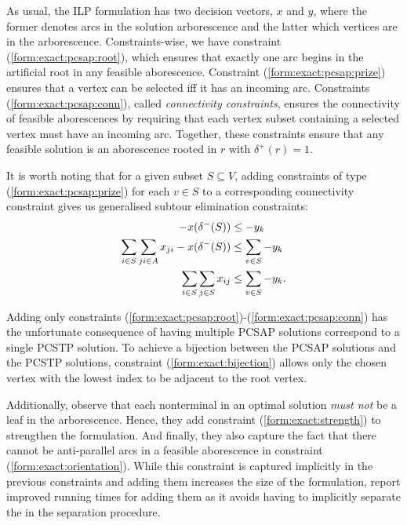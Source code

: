  As usual, the ILP formulation has two decision vectors, $x$ and $y$, where the former denotes arcs
 in the solution arborescence and the latter which vertices are in the arborescence. Constraints-wise,
 we have
 constraint (\ref{form:exact:pcsap:root}), which ensures that exactly one arc begins in the artificial
 root in any feasible aborescence. Constraint (\ref{form:exact:pcsap:prize}) ensures
 that a vertex can be selected iff it has an incoming arc.
 Constraints (\ref{form:exact:pcsap:conn}), called \textit{connectivity constraints},
 ensures the connectivity of feasible aborescences by requiring that
 each vertex subset containing a selected vertex must have an incoming arc.
 Together, these constraints ensure that any feasible solution is an aborescence rooted
 in $r$ with $\delta^+(r) = 1$.

 It is worth noting that for a given subset $S \subseteq V$, adding constraints of type
 (\ref{form:exact:pcsap:prize}) for each $v \in S$ to a corresponding connectivity constraint
  gives us generalised subtour elimination constraints:
 \begin{align*}
   -x(\delta^-(S)) &\leq -y_k \\
   \sum_{i \in S} \sum_{ji \in A} x_{ji} - x (\delta^-(S)) &\leq \sum_{v \in S} - y_k \\
   \sum_{i \in S} \sum_{j \in S} x_{ij} &\leq \sum_{v \in S} - y_k \mathnormal{.}
 \end{align*}

 Adding only constraints (\ref{form:exact:pcsap:root})-(\ref{form:exact:pcsap:conn})
 has the unfortunate consequence of having multiple 
 PCSAP solutions
 correspond
 to a single PCSTP solution. To achieve a bijection between the PCSAP solutions and the
 PCSTP solutions, constraint (\ref{form:exact:bijection}) allows only the chosen vertex
 with the lowest index to be adjacent to the root vertex.
 
 Additionally, \citet{ljubic2005solving} observe that each nonterminal in an optimal solution
 \textit{must not} be a leaf in the arborescence. Hence, they add constraint
 (\ref{form:exact:strength}) to strengthen the formulation. And finally, they
 also capture the fact that there cannot be anti-parallel arcs in a feasible aborescence in
 constraint (\ref{form:exact:orientation}). While this constraint is captured implicitly
 in the previous constraints and adding them increases the size of the formulation,
 \citet{ljubic2005solving} report improved running times for adding them as it avoids
 having to implicitly separate the in the separation procedure.
 
